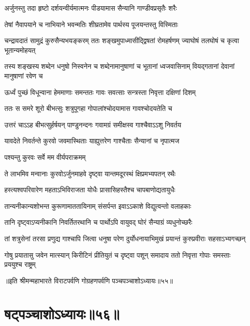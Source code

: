 \twolineshloka
{अर्जुनस्तु तदा हृष्टो दर्शयन्वीर्यमात्मनः}
{पीडयामास सैन्यानि गाण्डीवप्रसृतैः शरैः}


\twolineshloka
{तेषां नैवापयाने च नाभियाने भवन्मतिः}
{शीघ्रतामेव पार्थस्य पूजयन्तस्तु विस्मिताः}


\threelineshloka
{चन्द्रावदातं सामुद्रं कुरुसैन्यभयङ्करम्}
{ततः शङ्खमुपाध्मासीद्द्विषतां रोमहर्षणम्}
{ज्याघोषं तलघोषं च कृत्वा भूतान्यमोहयत्}


\threelineshloka
{तस्य शङ्खस्य शब्देन धनुषो निस्वनेन च}
{शब्देनामानुषाणां च भूतानां ध्वजवासिनाम्}
{वियद्गतानां देवानां मानुषाणां रवेण च}


\twolineshloka
{ऊर्ध्वं पुच्छं विधून्वाना हेममाणाः समन्ततः}
{गावः सवत्साः सन्त्रस्ता निवृत्ता दक्षिणां दिशम्}


\twolineshloka
{ततः स समरे शूरो बीभत्सुः शत्रुपूगहा}
{गोपालांश्चोदयामास गावश्चोदयतेति च}


\twolineshloka
{उत्तरं चाऽऽह बीभत्सुर्हर्षयन् पाण्डुनन्दनः}
{गवामग्रं समीक्षस्व गाश्चैवाऽऽशु निवर्तय}


\twolineshloka
{यावदेते निवर्तन्ते कुरवो जवमास्थिताः}
{याह्युत्तरेण गाश्चैताः सैन्यानां च नृपात्मज}


\onelineshloka
{पश्यन्तु कुरवः सर्वे मम वीर्यपराक्रमम्}



\twolineshloka
{ते लाभमिव मन्वानाः कुरवोऽर्जुनमाहवे}
{दृष्ट्वा यान्तमदूरस्थं क्षिप्रमभ्यपतन् रथैः}


\twolineshloka
{हस्त्यश्वपरिवारेण महताऽभिविराजता}
{योधैः प्रासासिहस्तैश्च चापबाणोद्यतायुधैः}


\twolineshloka
{तान्यनीकान्यशोभन्त कुरूणामाततायिनाम्}
{संसर्पन्त इवाऽऽकाशे विद्युत्वन्तो वलाहकाः}

\twolineshloka
{तानि दृष्ट्वाऽप्यनीकानि निवर्तितरथानि च}
{पार्थोऽपि वायुवद् घोरं सैन्याग्रं व्यधुनोच्छरैः}

\fourlineindentedshloka
{तां शत्रुसेनां तरसा प्रणुद्य}
{गाश्चापि जित्वा धनुषा परेण}
{दुर्योधनायाभिमुखं प्रयान्तं}
{कुरुप्रवीराः सहसाऽभ्यगच्छन्}


\fourlineindentedshloka
{गोषु प्रयातासु जवेन मात्स्यान्}
{किरीटिनं प्रीतियुतं च दृष्ट्वा}
{पशून् समादाय ततो निवृत्ता}
{गोपाः समस्ताः प्रययुश्च राष्ट्रम्}

॥इति श्रीमन्महाभारते विराटपर्वणि गोग्रहणपर्वणि पञ्चपञ्चाशोऽध्यायः॥५५॥

\chapter{षट्पञ्चाशोऽध्यायः॥५६॥}

